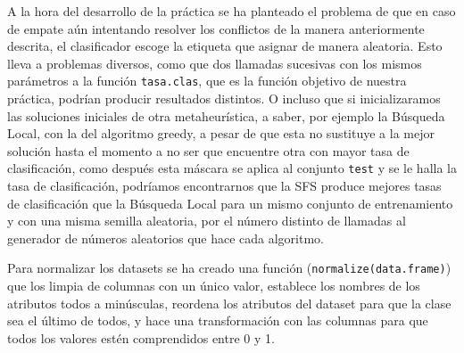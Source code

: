 \documentclass[a4paper,11pt]{article}
\begin{document}
A la hora del desarrollo de la práctica se ha planteado el problema de que en caso de empate aún intentando 
resolver los conflictos de la manera anteriormente descrita, el clasificador escoge la etiqueta que
asignar de manera aleatoria. Esto lleva a problemas diversos, como que dos llamadas sucesivas con los mismos
parámetros a la función \texttt{tasa.clas}, que es la función objetivo de nuestra práctica, podrían producir resultados 
distintos. O incluso que si inicializaramos las soluciones iniciales de otra metaheurística, a saber, por ejemplo la
Búsqueda Local, con la del algoritmo greedy, a pesar de que esta no sustituye a la mejor solución hasta el momento a 
no ser que encuentre otra con mayor tasa de clasificación, como después esta máscara se aplica al conjunto 
\texttt{test} y se le halla la tasa de clasificación, podríamos encontrarnos que la SFS produce mejores tasas
de clasificación que la Búsqueda Local para un mismo conjunto de entrenamiento y con una misma semilla aleatoria, por
el número distinto de llamadas al generador de números aleatorios que hace cada algoritmo.

Para normalizar los datasets se ha creado una función (\texttt{normalize(data.frame)}) que los limpia de columnas con
un único valor, establece los nombres de los atributos todos a minúsculas, reordena los atributos del dataset para que
la clase sea el último de todos, y hace una transformación con las columnas para que todos los valores estén comprendidos
entre 0 y 1.
\end{document}
